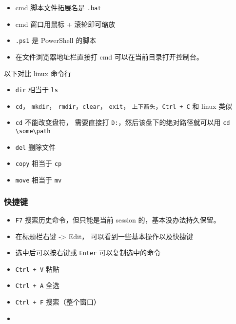 
\begin{issues}
\issueDraft
\end{issues}

\begin{itemize}
\item cmd 脚本文件拓展名是 \verb`.bat`
\item cmd 窗口用鼠标 + 滚轮即可缩放
\item \verb`.ps1` 是 PowerShell 的脚本
\item 在文件浏览器地址栏直接打 cmd 可以在当前目录打开控制台。
\end{itemize}

以下对比 linux 命令行
\begin{itemize}
\item \verb`dir` 相当于 \verb`ls`
\item \verb`cd`， \verb`mkdir`， \verb`rmdir`，\verb`clear`， \verb`exit`， \verb`上下箭头`，\verb`Ctrl + C` 和 linux 类似
\item \verb`cd` 不能改变盘符， 需要直接打 \verb`D:`，然后该盘下的绝对路径就可以用 \verb`cd \some\path`
\item \verb`del` 删除文件
\item \verb`copy` 相当于 \verb`cp`
\item \verb`move` 相当于 \verb`mv`
\end{itemize}

\subsubsection{快捷键}
\begin{itemize}
\item \verb`F7` 搜索历史命令，但只能是当前 session 的，基本没办法持久保留。
\item 在标题栏右键 -> Edit， 可以看到一些基本操作以及快捷键
\item 选中后可以按右键或 \verb`Enter` 可以复制选中的命令
\item \verb`Ctrl + V` 粘贴
\item \verb`Ctrl + A` 全选
\item \verb`Ctrl + F` 搜索（整个窗口）
\item 
\end{itemize}
